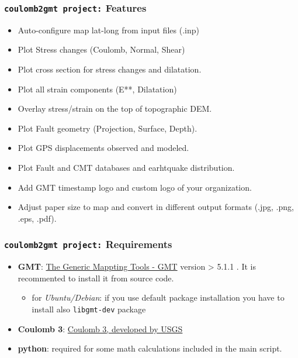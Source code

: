 \begin{frame}
\frametitle{\texttt{coulomb2gmt project:} Features}
\label{ch1fr:features}

\begin{itemize}
\item Auto-configure map lat-long from input files (.inp)
\item
  Plot Stress changes (Coulomb, Normal, Shear)
\item
  Plot cross section for stress changes and dilatation.
\item
  Plot all strain components (E**, Dilatation)
\item
  Overlay stress/strain on the top of topographic DEM.
\item
  Plot Fault geometry (Projection, Surface, Depth).
\item
  Plot GPS displacements observed and modeled.
\item
  Plot Fault and CMT databases and earhtquake distribution.
\item
  Add GMT timestamp logo and custom logo of your organization.
\item
  Adjust paper size to map and convert in different output formats
  (.jpg, .png, .eps, .pdf).
\end{itemize}

\end{frame}

\begin{frame}
\frametitle{\texttt{coulomb2gmt project:} Requirements}
\label{ch1fr:requirements}

\begin{itemize}
\item
  \textbf{GMT}: \href{http://gmt.soest.hawaii.edu/}{The Generic Mappting
  Tools - GMT} version \textgreater{} 5.1.1 . It is recommented to
  install it from source code.

  \begin{itemize}
  \item
    for \emph{Ubuntu/Debian}: if you use default package installation
    you have to install also \texttt{libgmt-dev} package
  \end{itemize}
\item
  \textbf{Coulomb 3}:
  \href{https://earthquake.usgs.gov/research/software/coulomb/}{Coulomb
  3, developed by USGS}
\item
  \textbf{python}: required for some math calculations included in the
  main script.
\end{itemize}
\end{frame}

